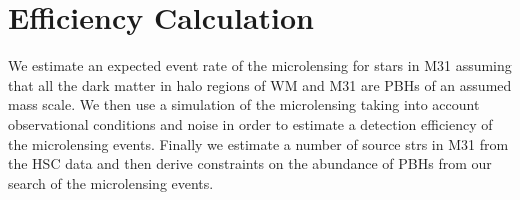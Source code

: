 \documentclass[iop, apj]{emulateapj}
\newcommand{\?}{\stackrel{?}{=}}
\begin{document}


\section{Efficiency Calculation}
We estimate an expected event rate of the microlensing for stars in M31 assuming that all the dark matter in halo regions of WM and M31 are PBHs of an assumed mass scale. 
We then use a simulation of the microlensing taking into account observational conditions and noise in order to estimate a detection efficiency of the microlensing events. 
Finally we estimate a number of source strs in M31 from the HSC data and then derive constraints on the abundance of PBHs from our search of the microlensing events. 
\end{document}
